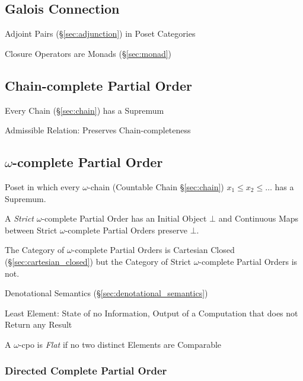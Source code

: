 \subsection{Galois Connection}\label{sec:galois_connection}

Adjoint Pairs (\S\ref{sec:adjunction}) in Poset Categories

Closure Operators are Monads (\S\ref{sec:monad})



\subsection{Chain-complete Partial Order}\label{sec:cpo}

Every Chain (\S\ref{sec:chain}) has a Supremum

Admissible Relation: Preserves Chain-completeness



\subsection{$\omega$-complete Partial Order}\label{sec:omega_cpo}

Poset in which every $\omega$-chain (Countable Chain
\S\ref{sec:chain}) $x_1 \leq x_2 \leq \ldots$ has a Supremum.

A \emph{Strict} $\omega$-complete Partial Order has an Initial Object
$\bot$ and Continuous Maps between Strict $\omega$-complete Partial
Orders preserve $\bot$.

The Category of $\omega$-complete Partial Orders is Cartesian Closed
(\S\ref{sec:cartesian_closed}) but the Category of Strict
$\omega$-complete Partial Orders is not.

Denotational Semantics (\S\ref{sec:denotational_semantics})

Least Element: State of no Information, Output of a Computation that
does not Return any Result

A $\omega$-cpo is \emph{Flat} if no two distinct Elements are
Comparable



\subsubsection{Directed Complete Partial Order}\label{sec:dcpo}

